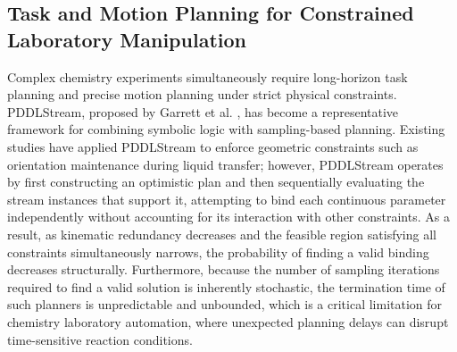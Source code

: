 \documentclass{ieeeaccess}
\begin{document}
\subsection{Task and Motion Planning for Constrained Laboratory Manipulation}\label{sec:2.2}
Complex chemistry experiments simultaneously require long-horizon task planning and precise motion planning under strict physical constraints. PDDLStream, proposed by Garrett et al. \cite{bib5}, has become a representative framework for combining symbolic logic with sampling-based planning. Existing studies have applied PDDLStream to enforce geometric constraints such as orientation maintenance during liquid transfer; however, PDDLStream operates by first constructing an optimistic plan and then sequentially evaluating the stream instances that support it, attempting to bind each continuous parameter independently without accounting for its interaction with other constraints. As a result, as kinematic redundancy decreases and the feasible region satisfying all constraints simultaneously narrows, the probability of finding a valid binding decreases structurally. Furthermore, because the number of sampling iterations required to find a valid solution is inherently stochastic, the termination time of such planners is unpredictable and unbounded, which is a critical limitation for chemistry laboratory automation, where unexpected planning delays can disrupt time-sensitive reaction conditions.
\end{document}
